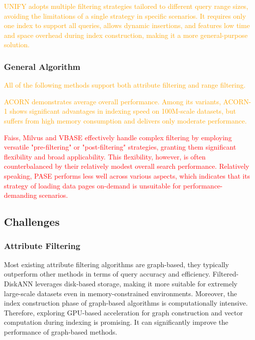 \documentclass[sigconf, nonacm]{acmart}
\begin{document}
{		\textcolor{orange}{
	UNIFY adopts multiple filtering strategies tailored to different query range sizes, avoiding the limitations of a single strategy in specific scenarios. It requires only one index to support all queries, allows dynamic insertions, and features low time and space overhead during index construction, making it a more general-purpose solution.}

	\subsubsection{General Algorithm}
\textcolor{orange}{All of the following methods support both attribute filtering and range filtering.}

\textcolor{orange}{
ACORN demonstrates average overall performance. Among its variants, ACORN-1 shows significant advantages in indexing speed on 100M-scale datasets, but suffers from high memory consumption and delivers only moderate performance.}

\textcolor{red}{
Faiss, Milvus and VBASE effectively handle complex filtering by employing versatile "pre-filtering" or "post-filtering" strategies, granting them significant flexibility and broad applicability. This flexibility, however, is often counterbalanced by their relatively modest overall search performance. Relatively speaking, PASE performs less well across various aspects, which indicates that its strategy of loading data pages on-demand is unsuitable for performance-demanding scenarios.}
	
	\subsection{Challenges}
	\subsubsection{Attribute Filtering}
	Most existing attribute filtering algorithms are graph-based, they typically outperform other methods in terms of query accuracy and efficiency. Filtered-DiskANN leverages disk-based storage, making it more suitable for extremely large-scale datasets even in memory-constrained environments. Moreover, the index construction phase of graph-based algorithms is computationally intensive. Therefore, exploring GPU-based acceleration for graph construction and vector computation during indexing is promising. It can significantly improve the performance of graph-based methods.
	
}
\end{document}
